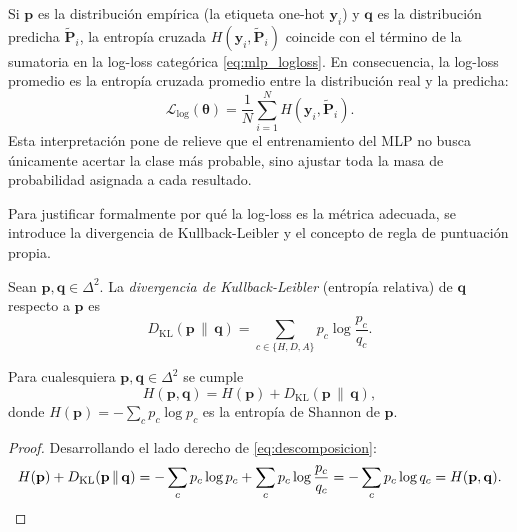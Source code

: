 Si $\mathbf{p}$ es la distribuci\'on emp\'irica (la etiqueta one-hot $\mathbf{y}_i$) y $\mathbf{q}$ es la distribuci\'on predicha $\tilde{\mathbf{P}}_i$, la entrop\'ia cruzada $H(\mathbf{y}_i, \tilde{\mathbf{P}}_i)$ coincide con el t\'ermino de la sumatoria en la log-loss categ\'orica \eqref{eq:mlp_logloss}. En consecuencia, la log-loss promedio es la entrop\'ia cruzada promedio entre la distribuci\'on real y la predicha:
\begin{equation}\label{eq:logloss_entropia}
	\mathcal{L}_{\mathrm{log}}(\boldsymbol{\theta}) = \frac{1}{N}\sum_{i=1}^{N} H(\mathbf{y}_i, \tilde{\mathbf{P}}_i).
\end{equation}
Esta interpretaci\'on pone de relieve que el entrenamiento del MLP no busca \'unicamente acertar la clase m\'as probable, sino ajustar toda la masa de probabilidad asignada a cada resultado.

Para justificar formalmente por qu\'e la log-loss es la m\'etrica adecuada, se introduce la divergencia de Kullback-Leibler y el concepto de regla de puntuaci\'on propia.

\begin{definition}
	Sean $\mathbf{p}, \mathbf{q} \in \Delta^2$. La \emph{divergencia de Kullback-Leibler} (entrop\'ia relativa) de $\mathbf{q}$ respecto a $\mathbf{p}$ es
	\begin{equation}\label{eq:kl}
		D_{\mathrm{KL}}(\mathbf{p} \,\|\, \mathbf{q}) = \sum_{c\in\{H,D,A\}} p_c \log\frac{p_c}{q_c}.
	\end{equation}
\end{definition}

\begin{prop}\label{prop:descomposicion}
	Para cualesquiera $\mathbf{p}, \mathbf{q} \in \Delta^2$ se cumple
	\begin{equation}\label{eq:descomposicion}
		H(\mathbf{p}, \mathbf{q}) = H(\mathbf{p}) + D_{\mathrm{KL}}(\mathbf{p} \,\|\, \mathbf{q}),
	\end{equation}
	donde $H(\mathbf{p}) = -\sum_c p_c \log p_c$ es la entrop\'ia de Shannon de $\mathbf{p}$.
\end{prop}

\begin{proof}
	Desarrollando el lado derecho de \eqref{eq:descomposicion}:
	\[
	H(\mathbf{p}) + D_{\mathrm{KL}}(\mathbf{p} \,\|\, \mathbf{q})
	= -\sum_c p_c \log p_c + \sum_c p_c \log\frac{p_c}{q_c}
	= -\sum_c p_c \log q_c
	= H(\mathbf{p}, \mathbf{q}). \qedhere
	\]
\end{proof}

